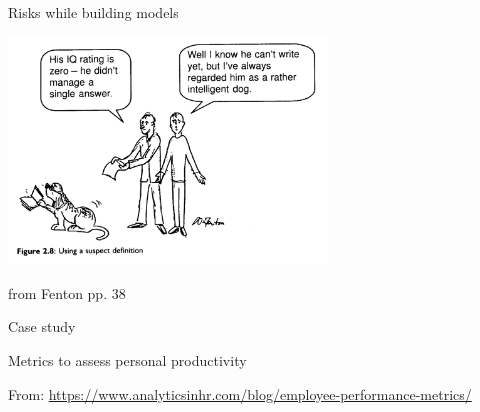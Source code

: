 \documentclass{beamer}
\begin{document}
\begin{frame}{\centerline{Risks while building models}}

\begin{center}
\includegraphics[width=85mm]{A2022.ScaleDeiDati/img-img20.png}
\newline
\end{center}
\begin{small}
\begin{center}
from Fenton pp. 38
\end{center}
\end{small}

\end{frame}

\begin{frame}{\centerline{Case study}}

\begin{center}
\LARGE
Metrics to assess personal productivity
\end{center}

\vspace{3cm}

{\tiny From:
\url{https://www.analyticsinhr.com/blog/employee-performance-metrics/}
}

\end{frame}
\end{document}
